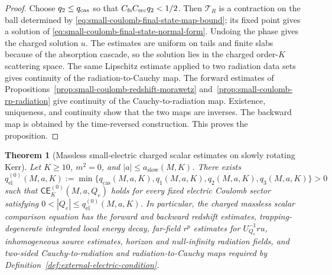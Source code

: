 \documentclass[11pt]{article}
\numberwithin{equation}{section}
\theoremstyle{plain}
\newtheorem{theorem}{Theorem}[section]
\theoremstyle{definition}
\theoremstyle{remark}
\newcommand{\CElec}{\mathsf{CE}}
\begin{document}
\begin{proof}
Choose \(q_2\le q_{\rm cas}\) so that \(C_{\rm fs}C_{\rm src}q_2<1/2\).  Then \(\mathcal T_R\) is a contraction on the ball determined by \eqref{eq:small-coulomb-final-state-map-bound}; its fixed point gives a solution of \eqref{eq:small-coulomb-final-state-normal-form}.  Undoing the phase gives the charged solution \(u\).  The estimates are uniform on tails and finite slabs because of the absorption cascade, so the solution lies in the charged order-\(K\) scattering space.  The same Lipschitz estimate applied to two radiation data sets gives continuity of the radiation-to-Cauchy map.  The forward estimates of Propositions~\ref{prop:small-coulomb-redshift-morawetz} and~\ref{prop:small-coulomb-rp-radiation} give continuity of the Cauchy-to-radiation map.  Existence, uniqueness, and continuity show that the two maps are inverses.  The backward map is obtained by the time-reversed construction.  This proves the proposition.
\end{proof}

\begin{theorem}[Massless small-electric charged scalar estimates on slowly rotating Kerr]\label{thm:small-coulomb-massless-kerr-condition}
Let \(K\ge10\), \(m^2=0\), and \(|a|\le a_{\mathrm{slow}}(M,K)\).  There exists
\begin{equation}\label{eq:small-coulomb-q-threshold}
 q^{(0)}_{\mathrm{el}}(M,a,K):=\min\{q_{\mathrm{cas}}(M,a,K),q_1(M,a,K),q_2(M,a,K),q_3(M,a,K)\}>0
\end{equation}
such that \(\CElec^{(0)}_K(M,a,Q_e)\) holds for every fixed electric Coulomb sector satisfying \(0<|Q_e|\le q^{(0)}_{\mathrm{el}}(M,a,K)\).  In particular, the charged massless scalar comparison equation has the forward and backward redshift estimates, trapping-degenerate integrated local energy decay, far-field \(r^p\) estimates for \(U_{Q_e}^{-1}ru\), inhomogeneous source estimates, horizon and null-infinity radiation fields, and two-sided Cauchy-to-radiation and radiation-to-Cauchy maps required by Definition~\ref{def:external-electric-condition}.
\end{theorem}
\end{document}
